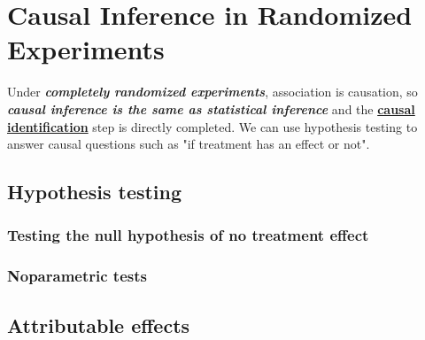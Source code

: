 \documentclass[11pt]{article}
\begin{document}
\section{Causal Inference in Randomized Experiments}
Under \emph{\textbf{completely randomized experiments}}, association is causation, so \emph{\textbf{causal inference is the same as statistical inference}} and the \underline{\textbf{causal identification}} step is directly completed. We can use hypothesis testing to answer causal questions such as "if treatment has an effect or not". 
\subsection{Hypothesis testing}
\subsubsection{Testing the null hypothesis of no treatment effect}
\subsubsection{Noparametric tests}
\subsection{Attributable effects}
\newpage


\end{document}
